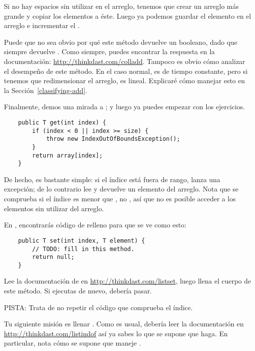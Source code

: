 \documentclass[12pt]{book}
\theoremstyle{exercise}
\begin{document}
Si no hay espacios sin utilizar en el arreglo, tenemos que crear un arreglo
más grande y copiar los elementos a éste. Luego ya podemos guardar el
elemento en el arreglo e incrementar el .


Puede que no sea obvio por qué este método devuelve un booleano, dado
que siempre devuelve . Como siempre, puedes encontrar la
respuesta en la documentación:
\url{http://thinkdast.com/colladd}.
Tampoco es obvio cómo analizar el desempeño de este
método. En el caso normal, es de tiempo constante, pero si tenemos
que redimensionar el arreglo, es lineal. Explicaré cómo manejar esto en la
Sección~\ref{classifying-add}.


Finalmente, demos una mirada a ; y luego ya puedes empezar con
los ejercicios.

\begin{verbatim}
    public T get(int index) {
        if (index < 0 || index >= size) {
            throw new IndexOutOfBoundsException();
        }
        return array[index];
    }
\end{verbatim}

De hecho,  es bastante simple:
si el índice está fuera de rango, lanza una excepción; de lo contrario
lee y devuelve un elemento del arreglo. Nota que se comprueba si
el índice es menor que , no , así que
no es posible acceder a los elementos sin utilizar del arreglo.


En , encontrarás código de relleno para  que
se ve como esto:

\begin{verbatim}
    public T set(int index, T element) {
        // TODO: fill in this method.
        return null;
    }
\end{verbatim}

Lee la documentación de  en
\url{http://thinkdast.com/listset}, luego llena el cuerpo de este
método. Si ejecutas  de nuevo,  debería
pasar.


PISTA: Trata de no repetir el código que comprueba el índice.

Tu siguiente misión es llenar . Como es usual, debería
leer la documentación en \url{http://thinkdast.com/listindof} así ya
sabes lo que se supone que haga. En particular, nota cómo se supone
que maneje .
\end{document}
